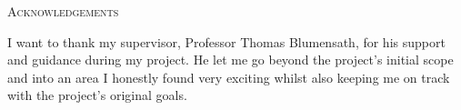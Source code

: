 \begin{center}
    \textsc{Acknowledgements}
\end{center}

I want to thank my supervisor, Professor Thomas Blumensath, for his support and guidance during my project. He let me go beyond the project's initial scope and into an area I honestly found very exciting whilst also keeping me on track with the project's original goals.

